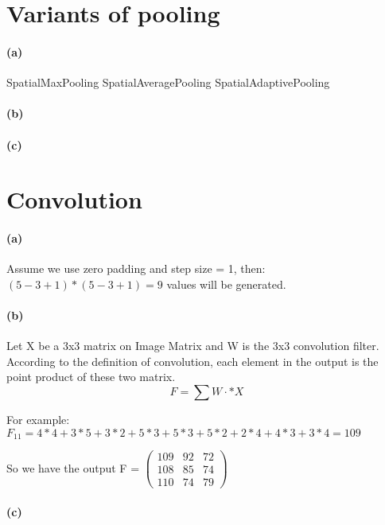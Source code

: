 \documentclass{article}
\begin{document}
\section{Variants of pooling}

\paragraph{(a)}
SpatialMaxPooling
SpatialAveragePooling
SpatialAdaptivePooling
\paragraph{(b)}
\paragraph{(c)}

\section{Convolution}

\paragraph{(a)}
Assume we use zero padding and step size = 1, then:
$(5-3+1)*(5-3+1) = 9$ values will be generated.

\paragraph{(b)}
Let X be a 3x3 matrix on Image Matrix and W is the 3x3 convolution filter. \\
According to the definition of convolution, each element in the output is the point product of these two matrix.
\begin{equation}
F = \sum W \cdot \ast X
\end{equation}

For example:
$F_11 = 4*4+3*5+3*2+5*3+5*3+5*2+2*4+4*3+3*4= 109$

So we have the output F =
$\begin{pmatrix}
  109 & 92 & 72 \\
  108 & 85 & 74 \\
  110 & 74 & 79
\end{pmatrix}$

\paragraph{(c)}
\end{document}
